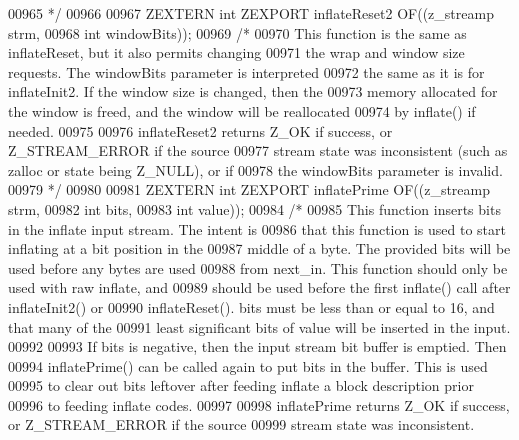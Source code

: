 \begin{DoxyCode}
00965 \textcolor{comment}{*/}
00966 
00967 ZEXTERN \textcolor{keywordtype}{int} ZEXPORT inflateReset2 OF((z\_streamp strm,
00968                                       \textcolor{keywordtype}{int} windowBits));
00969 \textcolor{comment}{/*}
00970 \textcolor{comment}{     This function is the same as inflateReset, but it also permits changing}
00971 \textcolor{comment}{   the wrap and window size requests.  The windowBits parameter is interpreted}
00972 \textcolor{comment}{   the same as it is for inflateInit2.  If the window size is changed, then the}
00973 \textcolor{comment}{   memory allocated for the window is freed, and the window will be reallocated}
00974 \textcolor{comment}{   by inflate() if needed.}
00975 \textcolor{comment}{}
00976 \textcolor{comment}{     inflateReset2 returns Z\_OK if success, or Z\_STREAM\_ERROR if the source}
00977 \textcolor{comment}{   stream state was inconsistent (such as zalloc or state being Z\_NULL), or if}
00978 \textcolor{comment}{   the windowBits parameter is invalid.}
00979 \textcolor{comment}{*/}
00980 
00981 ZEXTERN \textcolor{keywordtype}{int} ZEXPORT inflatePrime OF((z\_streamp strm,
00982                                      \textcolor{keywordtype}{int} bits,
00983                                      \textcolor{keywordtype}{int} value));
00984 \textcolor{comment}{/*}
00985 \textcolor{comment}{     This function inserts bits in the inflate input stream.  The intent is}
00986 \textcolor{comment}{   that this function is used to start inflating at a bit position in the}
00987 \textcolor{comment}{   middle of a byte.  The provided bits will be used before any bytes are used}
00988 \textcolor{comment}{   from next\_in.  This function should only be used with raw inflate, and}
00989 \textcolor{comment}{   should be used before the first inflate() call after inflateInit2() or}
00990 \textcolor{comment}{   inflateReset().  bits must be less than or equal to 16, and that many of the}
00991 \textcolor{comment}{   least significant bits of value will be inserted in the input.}
00992 \textcolor{comment}{}
00993 \textcolor{comment}{     If bits is negative, then the input stream bit buffer is emptied.  Then}
00994 \textcolor{comment}{   inflatePrime() can be called again to put bits in the buffer.  This is used}
00995 \textcolor{comment}{   to clear out bits leftover after feeding inflate a block description prior}
00996 \textcolor{comment}{   to feeding inflate codes.}
00997 \textcolor{comment}{}
00998 \textcolor{comment}{     inflatePrime returns Z\_OK if success, or Z\_STREAM\_ERROR if the source}
00999 \textcolor{comment}{   stream state was inconsistent.}

\end{DoxyCode}
